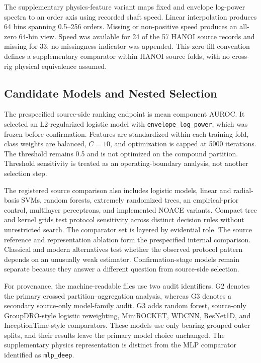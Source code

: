 \documentclass[machines,article,submit,oneauthor,pdftex]{Definitions/mdpi}
\begin{document}
The supplementary physics-feature variant maps fixed and envelope log-power spectra to an order axis using recorded shaft speed. Linear interpolation produces 64 bins spanning 0.5--256 orders. Missing or non-positive speed produces an all-zero 64-bin view. Speed was available for 24 of the 57 HANOI source records and missing for 33; no missingness indicator was appended. This zero-fill convention defines a supplementary comparator within HANOI source folds, with no cross-rig physical equivalence assumed.

\subsection{Candidate Models and Nested Selection}

The prespecified source-side ranking endpoint is mean component AUROC. It selected an L2-regularized logistic model with \texttt{envelope\_log\_power}, which was frozen before confirmation. Features are standardized within each training fold, class weights are balanced, $C=10$, and optimization is capped at 5000 iterations. The threshold remains 0.5 and is not optimized on the compound partition. Threshold sensitivity is treated as an operating-boundary analysis, not another selection step.

The registered source comparison also includes logistic models, linear and radial-basis SVMs, random forests, extremely randomized trees, an empirical-prior control, multilayer perceptrons, and implemented NOACE variants. Compact tree and kernel grids test protocol sensitivity across distinct decision rules without unrestricted search. The comparator set is layered by evidential role. The source reference and representation ablation form the prespecified internal comparison. Classical and modern alternatives test whether the observed protocol pattern depends on an unusually weak estimator. Confirmation-stage models remain separate because they answer a different question from source-side selection.

For provenance, the machine-readable files use two audit identifiers. G2 denotes the primary crossed partition--aggregation analysis, whereas G3 denotes a secondary source-only model-family audit. G3 adds random forest, source-only GroupDRO-style logistic reweighting, MiniROCKET, WDCNN, ResNet1D, and InceptionTime-style comparators. These models use only bearing-grouped outer splits, and their results leave the primary model choice unchanged. The supplementary physics representation is distinct from the MLP comparator identified as \texttt{mlp\_deep}.
\end{document}
